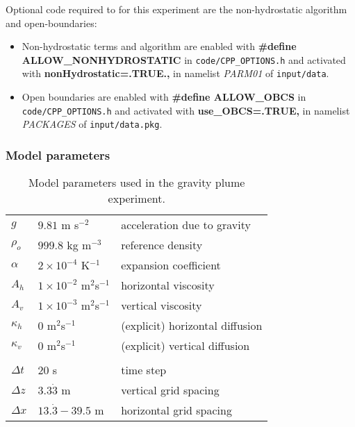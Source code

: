 Optional code required to for this experiment are the non-hydrostatic
algorithm and open-boundaries:
\begin{itemize}
\item Non-hydrostatic terms and algorithm are enabled with {\bf
\#define ALLOW\_NONHYDROSTATIC} in {\tt code/CPP\_OPTIONS.h} and
activated with {\bf nonHydrostatic=.TRUE.,} in namelist {\em PARM01}
of {\tt input/data}.
\item Open boundaries are enabled with {\bf \#define ALLOW\_OBCS} in
{\tt code/CPP\_OPTIONS.h} and activated with {\bf use\_OBCS=.TRUE,} in
namelist {\em PACKAGES} of {\tt input/data.pkg}.
\end{itemize}

\subsubsection{Model parameters}
\label{sect:plume-params}

\begin{table}
\begin{center}
\begin{tabular}{lll}
$g$ & $9.81$ m s$^{-2}$ & acceleration due to gravity \\
$\rho_o$ & $999.8$ kg m$^{-3}$ & reference density \\
$\alpha$ & $2 \times 10^{-4}$ K$^{-1}$ & expansion coefficient \\
$A_h$ & $1 \times 10^{-2}$ m$^2$s$^{-1}$ & horizontal viscosity \\
$A_v$ & $1 \times 10^{-3}$ m$^2$s$^{-1}$ & vertical viscosity \\
$\kappa_h$ & $0$ m$^2$s$^{-1}$ & (explicit) horizontal diffusion \\
$\kappa_v$ & $0$ m$^2$s$^{-1}$ & (explicit) vertical diffusion \\
\\
$\Delta t$ & $20$ s & time step \\
$\Delta z$ & $3.3\dot{3}$ m & vertical grid spacing \\
$\Delta x$ & $13.\dot{3}-39.5$ m & horizontal grid spacing
\end{tabular}
\end{center}
\caption{Model parameters used in the gravity plume experiment.}
\label{table:plume-on-slope}
\end{table}

